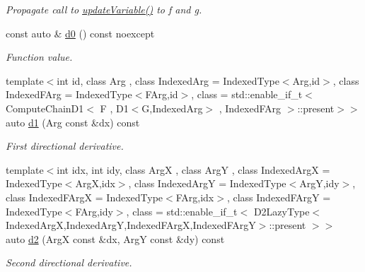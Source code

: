 \begin{DoxyCompactItemize}
\begin{DoxyCompactList}\small\item\em Propagate call to \hyperlink{structFunG_1_1MathematicalOperations_1_1Chain_adf372d1f3b00903528740f3da6820b77}{update\-Variable()} to f and g. \end{DoxyCompactList}\item 
\hypertarget{structFunG_1_1MathematicalOperations_1_1Chain_abaced47a1bdc62dd6625caed1d11134c}{const auto \& \hyperlink{structFunG_1_1MathematicalOperations_1_1Chain_abaced47a1bdc62dd6625caed1d11134c}{d0} () const noexcept}\label{structFunG_1_1MathematicalOperations_1_1Chain_abaced47a1bdc62dd6625caed1d11134c}

\begin{DoxyCompactList}\small\item\em Function value. \end{DoxyCompactList}\item 
{\footnotesize template$<$int id, class Arg , class Indexed\-Arg  = Indexed\-Type$<$\-Arg,id$>$, class Indexed\-F\-Arg  = Indexed\-Type$<$\-F\-Arg,id$>$, class  = std\-::enable\-\_\-if\-\_\-t$<$ Compute\-Chain\-D1$<$ F , D1$<$\-G,\-Indexed\-Arg$>$ , Indexed\-F\-Arg $>$\-::present$>$$>$ }\\auto \hyperlink{structFunG_1_1MathematicalOperations_1_1Chain_adfe741dee89257258b39df846fd16cf7}{d1} (Arg const \&dx) const 
\begin{DoxyCompactList}\small\item\em First directional derivative. \end{DoxyCompactList}\item 
{\footnotesize template$<$int idx, int idy, class Arg\-X , class Arg\-Y , class Indexed\-Arg\-X  = Indexed\-Type$<$\-Arg\-X,idx$>$, class Indexed\-Arg\-Y  = Indexed\-Type$<$\-Arg\-Y,idy$>$, class Indexed\-F\-Arg\-X  = Indexed\-Type$<$\-F\-Arg,idx$>$, class Indexed\-F\-Arg\-Y  = Indexed\-Type$<$\-F\-Arg,idy$>$, class  = std\-::enable\-\_\-if\-\_\-t$<$ D2\-Lazy\-Type$<$\-Indexed\-Arg\-X,\-Indexed\-Arg\-Y,\-Indexed\-F\-Arg\-X,\-Indexed\-F\-Arg\-Y$>$\-::present $>$$>$ }\\auto \hyperlink{structFunG_1_1MathematicalOperations_1_1Chain_a0ab88c09299ce967583408f7f7dcd2bb}{d2} (Arg\-X const \&dx, Arg\-Y const \&dy) const 
\begin{DoxyCompactList}\small\item\em Second directional derivative. \end{DoxyCompactList}\item 

\end{DoxyCompactItemize}
